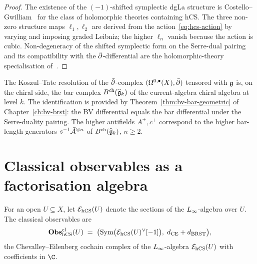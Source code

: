 \begin{proof}
The existence of the $(-1)$-shifted symplectic dgLa structure is
Costello--Gwilliam~\cite[Ch.\,5,\,\S5.3--5.6]{CostelloGwilliam2017} for
the class of holomorphic theories containing hCS. The three non-zero
structure maps $\ell_1,\ell_2$ are derived from the
action~\eqref{eq:hcs-action} by varying and imposing graded Leibniz; the
higher $\ell_n$ vanish because the action is cubic.
Non-degeneracy of the shifted symplectic form on the Serre-dual pairing
and its compatibility with the $\bar\partial$-differential are the
holomorphic-theory specialisation
of~\cite[Ch.\,5,\,\S5.3--5.6]{CostelloGwilliam2017}.
\end{proof}

\begin{remark}[Chiral avatar: Koszul--Tate = bar--cobar]
\label{rem:kt-equals-bar-cobar}
The Koszul--Tate resolution of the
$\bar\partial$-complex $(\Omega^{0,\bullet}(X),\bar\partial)$ tensored with $\mathfrak{g}$ is, on the
chiral side, the bar complex $B^{\mathrm{ch}}(\widehat{\mathfrak{g}}_k)$ of the
current-algebra chiral algebra at level $k$. The identification is
provided by
Theorem~\ref{thm:bv-bar-geometric} of
Chapter~\ref{ch:bv-brst}: the BV differential equals the bar
differential under the Serre-duality pairing. The higher antifields
$A^+, c^+$ correspond to the higher bar-length generators
$s^{-1}\bar{\mathcal{A}}^{\otimes n}$ of $B^{\mathrm{ch}}(\widehat{\mathfrak{g}}_k)$,
$n\ge 2$.
\end{remark}

\section{Classical observables as a factorisation algebra}
\label{sec:hcs-obs-cl-factorisation}

\begin{definition}
\label{def:hcs-obs-cl}
%
For an open $U\subseteq X$, let $\mathcal{E}_{\mathrm{hCS}}(U)$ denote the sections of
the $L_\infty$-algebra over $U$. The classical observables are
\begin{equation}
 \mathbf{Obs}^{\mathrm{cl}}_{\mathrm{hCS}}(U) \;=\;
 \bigl(\mathrm{Sym}\bigl(\mathcal{E}_{\mathrm{hCS}}(U)^\vee[-1]\bigr),\;
 d_{\mathrm{CE}}+d_{\mathrm{BRST}}\bigr),
\end{equation}
the Chevalley--Eilenberg cochain complex of the $L_\infty$-algebra
$\mathcal{E}_{\mathrm{hCS}}(U)$ with coefficients in $\C$.
\end{definition}

